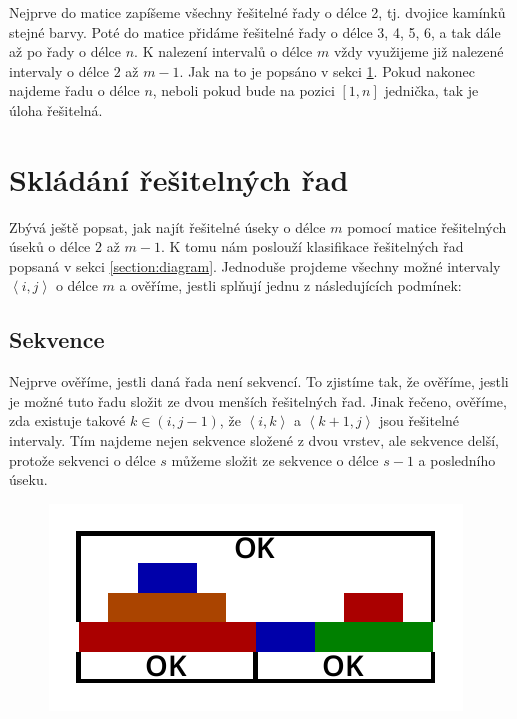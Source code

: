 \documentclass{article}
\begin{document}
Nejprve do matice zapíšeme všechny řešitelné řady o délce 2, tj. dvojice kamínků stejné barvy. Poté do matice přidáme řešitelné řady o délce 3, 4, 5, 6, a tak dále až po řady o délce $n$. K nalezení intervalů o délce $m$ vždy využijeme již nalezené intervaly o délce $2$ až $m - 1$. Jak na to je popsáno v sekci \ref{section:composition}. Pokud nakonec najdeme řadu o délce $n$, neboli pokud bude na pozici $\left[1, n\right]$ jednička, tak je úloha řešitelná.

\section{Skládání řešitelných řad}
\label{section:composition}

Zbývá ještě popsat, jak najít řešitelné úseky o délce $m$ pomocí matice řešitelných úseků o délce $2$ až $m - 1$. K tomu nám poslouží klasifikace řešitelných řad popsaná v sekci \ref{section:diagram}. Jednoduše projdeme všechny možné intervaly $\left<i, j\right>$ o délce $m$ a ověříme, jestli splňují jednu z následujících podmínek:

\subsection{Sekvence}

Nejprve ověříme, jestli daná řada není sekvencí. To zjistíme tak, že ověříme, jestli je možné tuto řadu složit ze dvou menších řešitelných řad. Jinak řečeno, ověříme, zda existuje takové $k \in \left(i, j - 1\right)$, že $\left<i, k\right>$ a $\left<k + 1, j\right>$ jsou řešitelné intervaly. Tím najdeme nejen sekvence složené z dvou vrstev, ale sekvence delší, protože sekvenci o délce $s$ můžeme složit ze sekvence o délce $s - 1$ a posledního úseku.

\begin{figure}[H]
    \centering
    \includegraphics[scale=1]{solve-sequence.pdf}
\end{figure}
\end{document}
